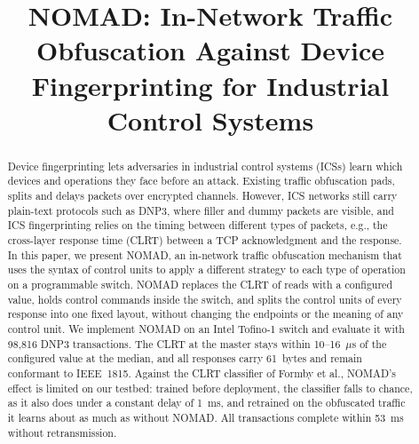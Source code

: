 \documentclass[conference]{IEEEtran}
\begin{document}
\title{
NOMAD: In-Network Traffic Obfuscation Against Device Fingerprinting for Industrial Control Systems
}

\author{
\and
{}
}
\vspace{0pt}
\maketitle

\begin{abstract}
Device fingerprinting lets adversaries in industrial control systems (ICSs) learn which devices and operations they face before an attack. Existing traffic obfuscation pads, splits and delays packets over encrypted channels. However, ICS networks still carry plain-text protocols such as DNP3, where filler and dummy packets are visible, and ICS fingerprinting relies on the timing between different types of packets, e.g., the cross-layer response time (CLRT) between a TCP acknowledgment and the response. In this paper, we present NOMAD, an in-network traffic obfuscation mechanism that uses the syntax of control units to apply a different strategy to each type of operation on a programmable switch. NOMAD replaces the CLRT of reads with a configured value, holds control commands inside the switch, and splits the control units of every response into one fixed layout, without changing the endpoints or the meaning of any control unit. We implement NOMAD on an Intel Tofino-1 switch and evaluate it with 98,816 DNP3 transactions. The CLRT at the master stays within 10--16~$\mu$s of the configured value at the median, and all responses carry 61~bytes and remain conformant to IEEE~1815. Against the CLRT classifier of Formby et al., NOMAD's effect is limited on our testbed: trained before deployment, the classifier falls to chance, as it also does under a constant delay of 1~ms, and retrained on the obfuscated traffic it learns about as much as without NOMAD. All transactions complete within 53~ms without retransmission.
\end{abstract}
\end{document}
